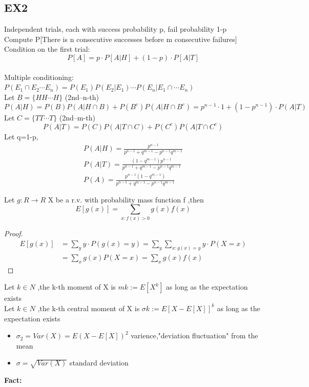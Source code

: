 \subsection*{EX2}
Independent trials, each with success probability p, fail probability 1-p
\\Compute P[There is n consecutive successes before m consecutive failures]
Condition on the first trial: $$
    P[A]=p\cdot P[A|H]+(1-p)\cdot P[A|T]
$$ 
\\Multiple conditioning: $ P(E_1\cap E_2\cdots E_n)=P(E_1)P(E_2|E_1)\cdots P(E_n|E_1\cap\cdots E_n) $ \\
Let $ B=\{HH\cdots H\} $ (2nd--n-th) $$ P(A|H)=P(B)P(A|H\cap B)+P(B^c)P(A|H\cap B^c)=p^{n-1}\cdot 1+(1-p^{n-1})\cdot P(A|T) $$ 
Let $ C=\{TT\cdots T\} $ (2nd--m-th) $$ P(A|T)=P(C)P(A|T\cap C)+P(C^c)P(A|T\cap C^c)$$
Let q=1-p,\begin{align*}{}{}
P(A|H)=\frac{p^{n-1}}{p^{n-1}+q^{m-1}-p^{n-1}q^{m-1}}\\
P(A|T)=\frac{(1-q^{m-1})p^{n-1}}{p^{n-1}+q^{m-1}-p^{n-1}q^{m-1}}\\
P(A)=\frac{p^{n-1}(1-q^{m-1})}{p^{n-1}+q^{m-1}-p^{n-1}q^{m-1}}
\end{align*}
\begin{lemma}{}
Let $ g:R\rightarrow R$ X be a r.v. with probability mass function f ,then $$
    E[g(x)]=\sum_{x:f(x)>0}g(x)f(x)
$$ 
\end{lemma}
\begin{proof}
    \begin{align*}{}{}
    E[g(x)]&=\sum_{y}y\cdot P(g(x)=y)=\sum_{y}\sum_{x:g(x)=y}y\cdot P(X=x)\\
       &=\sum_{x}g(x)P(X=x)=\sum_{x}g(x)f(x)
    \end{align*}
\end{proof}
\begin{definition}[]{}
Let $ k\in N $ ,the k-th moment of X is $ mk:= E[X^k] $ as long as the expectation exists\\
Let $ k\in N $ ,the k-th central moment of X is $ \sigma k:= E[X-E[X]]^k $ as long as the expectation exists\\
\begin{itemize}
\item $ \sigma_2=Var (X)=E(X-E[X])^2 $ varience,"deviation fluctuation" from the mean
\item $ \sigma=\sqrt{Var(X)} $ standard deviation
\end{itemize}
\end{definition}
\textbf{Fact:}
